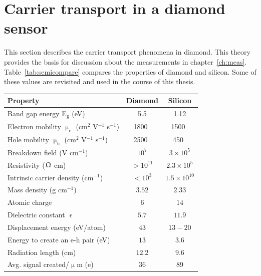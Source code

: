 \section{Carrier transport in a diamond sensor} 
\label{sec:carrtransp}
This section describes the carrier transport phenomena in diamond. This theory provides the basis for discussion about the measurements in chapter~\ref{ch:meas}. 
Table~\ref{tab:semicompare} compares the properties of diamond and silicon. Some of these values are revisited and used in the course of this thesis. 

\begin{footnotesize}
\begin{center}
\begin{tabular}{   l  c  c   }
\hline
Property & Diamond & Silicon \\
\hline
Band gap energy E$_\mathrm{g}$ (eV) & 5.5 & 1.12  \\
Electron mobility $\upmu_\mathrm{e}$ (cm$^2$ V$^{-1}$ s$^{-1}$) & 1800~\cite{Jansen:1956431} & 1500~\cite{PHSEM:00000} \\
Hole mobility $\upmu_\mathrm{h}$ (cm$^2$ V$^{-1}$ s$^{-1}$) & 2500~\cite{Jansen:1956431} & 450~\cite{PHSEM:00000} \\
Breakdown field (V cm$^{-1}$) & $10^{7}$ & $3\times 10^5$ \\
Resistivity ($\Upomega$ cm) & $>10^{11}$  & $2.3\times 10^5$  \\
Intrinsic carrier density (cm$^{-1}$) & $<10^3$ & $1.5\times 10^{10} $ \\
Mass density (g cm$^{-1}$) & $ 3.52$ & $2.33 $ \\
Atomic charge  & $6 $ & $ 14$ \\
Dielectric constant $\upvarepsilon$ & $5.7 $ & $11.9 $ \\
Displacement energy (eV/atom) & $43 $ & $13-20 $ \\
Energy to create an e-h pair  (eV) & $13 $ & $ 3.6$ \\
Radiation length (cm) & $ 12.2$ & $9.6 $ \\
Avg. signal created/$\upmu$m (e) & 36 & 89 \\\hline
\end{tabular}
\label{tab:semicompare}
\end{center}
\end{footnotesize}
 

